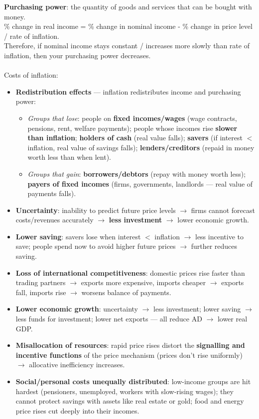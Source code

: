\documentclass[a4paper,12pt]{article}
\newcommand{\needbold}[1]{\textcolor{red!70!black}{\textbf{#1}}}
\begin{document}
\needbold{Purchasing power}: the quantity of goods and services that can be bought with money.\\
\% change in real income = \% change in nominal income - \% change in price level / rate of inflation.\\
Therefore, if nominal income stays constant / increases more slowly than rate of inflation, then your purchasing power decreases.\\\\
Costs of inflation:
\begin{itemize}
  \item \textbf{Redistribution effects} --- inflation redistributes income and purchasing power:
  \begin{itemize}
    \item \textit{Groups that lose}: people on \textbf{fixed incomes/wages} (wage contracts, pensions, rent, welfare payments); people whose incomes rise \textbf{slower than inflation}; \textbf{holders of cash} (real value falls); \textbf{savers} (if interest $<$ inflation, real value of savings falls); \textbf{lenders/creditors} (repaid in money worth less than when lent).
    \item \textit{Groups that gain}: \textbf{borrowers/debtors} (repay with money worth less); \textbf{payers of fixed incomes} (firms, governments, landlords --- real value of payments falls).
  \end{itemize}
  \item \textbf{Uncertainty}: inability to predict future price levels $\to$ firms cannot forecast costs/revenues accurately $\to$ \textbf{less investment} $\to$ lower economic growth.
  \item \textbf{Lower saving}: savers lose when interest $<$ inflation $\to$ less incentive to save; people spend now to avoid higher future prices $\to$ further reduces saving.
  \item \textbf{Loss of international competitiveness}: domestic prices rise faster than trading partners $\to$ exports more expensive, imports cheaper $\to$ exports fall, imports rise $\to$ worsens balance of payments.
  \item \textbf{Lower economic growth}: uncertainty $\to$ less investment; lower saving $\to$ less funds for investment; lower net exports --- all reduce AD $\to$ lower real GDP.
  \item \textbf{Misallocation of resources}: rapid price rises distort the \textbf{signalling and incentive functions} of the price mechanism (prices don't rise uniformly) $\to$ allocative inefficiency increases.
  \item \textbf{Social/personal costs unequally distributed}: low-income groups are hit hardest (pensioners, unemployed, workers with slow-rising wages); they cannot protect savings with assets like real estate or gold; food and energy price rises cut deeply into their incomes.
\end{itemize}
\end{document}
